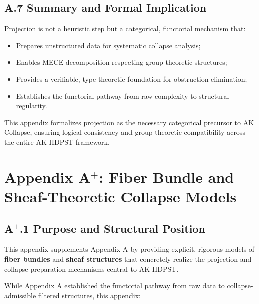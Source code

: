 \documentclass[11pt]{article}
\begin{document}
\subsection*{A.7 Summary and Formal Implication}

Projection is not a heuristic step but a categorical, functorial mechanism that:

\begin{itemize}
    \item Prepares unstructured data for systematic collapse analysis;
    \item Enables MECE decomposition respecting group-theoretic structures;
    \item Provides a verifiable, type-theoretic foundation for obstruction elimination;
    \item Establishes the functorial pathway from raw complexity to structural regularity.
\end{itemize}

This appendix formalizes projection as the necessary categorical precursor to AK Collapse, ensuring logical consistency and group-theoretic compatibility across the entire AK-HDPST framework.




\section*{Appendix A$^{+}$: Fiber Bundle and Sheaf-Theoretic Collapse Models}

\subsection*{A$^{+}$.1 Purpose and Structural Position}

This appendix supplements Appendix A by providing explicit, rigorous models of \textbf{fiber bundles} and \textbf{sheaf structures} that concretely realize the projection and collapse preparation mechanisms central to AK-HDPST.

While Appendix A established the functorial pathway from raw data to collapse-admissible filtered structures, this appendix:
\end{document}
